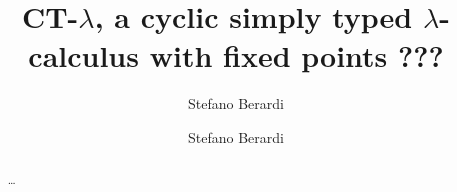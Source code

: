 \ifdraft

\title{CT-$\lambda$, a cyclic simply typed $\lambda$-calculus with fixed points}

\author{Stefano Berardi }
\date{}

\else

\title[Equivalence]
{
???
}

\author[S. Berardi]{Stefano Berardi}
\address{Universit\`{a} di Torino,
Torino, Italy}


\fi

\maketitle

\begin{abstract}

\ldots

\end{abstract}

\iffalse
key words: 
proof theory,
inductive definitions,
Brotherston-Simpson conjecture,
cyclic proofs,
Martin-Lof's system of inductive definitions,
infinite Ramsey theorem
Podelski-Rybalchenko termination theorem
size-change termination theorem
\fi